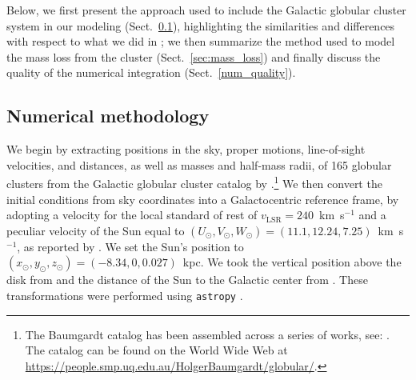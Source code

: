     Below, we first present the approach used to include the Galactic globular cluster system in our modeling (Sect.~\ref{numerical_meth}), highlighting the similarities and differences with respect to what we did in \citet{2023A&A...673A..44F}; we then summarize the method used to model the mass loss from the cluster (Sect.~\ref{sec:mass_loss}) and finally discuss the quality of the numerical integration (Sect.~\ref{num_quality}). 

    \subsection{Numerical methodology}\label{numerical_meth}
        We begin by extracting positions in the sky, proper motions, line-of-sight velocities, and distances, as well as masses and half-mass radii, of 165 globular clusters from the Galactic globular cluster catalog by \cite{2021MNRAS.505.5957B}.\footnote{The Baumgardt catalog has been assembled across a series of works, see: \cite{2020PASA...37...46B,2019MNRAS.482.5138B,2018MNRAS.478.1520B}. The catalog can be found on the World Wide Web at \href{https://people.smp.uq.edu.au/HolgerBaumgardt/globular/}{https://people.smp.uq.edu.au/HolgerBaumgardt/globular/}.} We then convert the initial conditions from sky coordinates into a Galactocentric reference frame, by adopting a velocity for the local standard of rest of $v_{\text{LSR}} = 240$~km~s$^{-1}$ and a peculiar velocity of the Sun equal to $(U_\odot, V_\odot, W_\odot)=(11.1, 12.24, 7.25)$~km~s$^{-1}$, as reported by \citet{2012MNRAS.427..274S}.  We set the Sun's position to $(x_\odot,y_\odot,z_\odot) = (-8.34,0,0.027)$~kpc. We took the vertical position above the disk from \citet{2001ApJ...553..184C} and the distance of the Sun to the Galactic center from \citet{2014ApJ...783..130R}. These transformations were performed using \texttt{astropy} \citep{2013A&A...558A..33A}.


